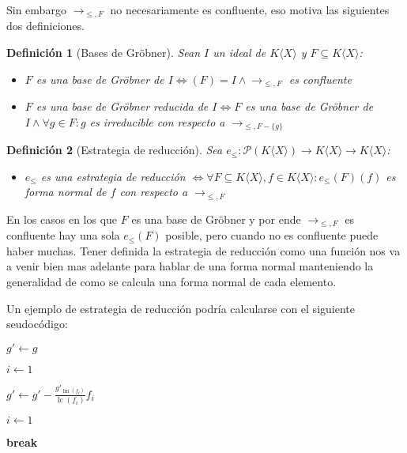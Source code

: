 \documentclass{amsbook} %
\theoremstyle{customstyle}
\newtheorem{definition}{Definición}[section]
\DeclareMathOperator{\sop}{sop}
\DeclareMathOperator{\lm}{lm}
\DeclareMathOperator{\lc}{lc}
\begin{document}
Sin embargo $→_{≤, F}$ no necesariamente es confluente, eso motiva las siguientes dos definiciones.

\begin{definition}[Bases de Gröbner]\label{def:base de Gröbner}
Sean $I$ un ideal de $K⟨X⟩$ y $F ⊆ K⟨X⟩$:
\begin{itemize}
\item $F$ es una base de Gröbner de $I ⇔ (F) = I ∧ →_{≤, F}$ es confluente
\item $F$ es una base de Gröbner reducida de $I ⇔ F$ es una base de Gröbner de $I ∧ ∀g ∈ F : g$ es irreducible con respecto a $→_{≤, F - \{g\}}$
\end{itemize}
\end{definition}

\begin{definition}[Estrategia de reducción]
Sea $e_≤ : 𝒫(K⟨X⟩) → K⟨X⟩ → K⟨X⟩$:
\begin{itemize}
\item $e_≤$ es una estrategia de reducción $⇔ ∀F ⊆ K⟨X⟩, f ∈ K⟨X⟩ : e_≤(F)(f)$ es forma normal de $f$ con respecto a $→_{≤, F}$
\end{itemize}
\end{definition}

En los casos en los que $F$ es una base de Gröbner y por ende $→_{≤, F}$ es confluente hay una sola $e_≤(F)$ posible, pero cuando no es confluente puede haber muchas. Tener definida la estrategia de reducción como una función nos va a venir bien mas adelante para hablar de una forma normal manteniendo la generalidad de como se calcula una forma normal de cada elemento.

Un ejemplo de estrategia de reducción podría calcularse con el siguiente seudocódigo:

\begin{algorithm}[H] %
  \caption{Ejemplo de estrategia de reducción}\label{alg:estrategia de reducción}
  $g' ← g$

  $i ← 1$

   {
     {
      \If{$f_i ∈ \sop(g')$} {
        $g' ← g' - \frac{g'_{\lm(f_i)}}{\lc(f_i)}f_i$

        $i ← 1$

        \textbf{break}
      }
    }
  }
\end{algorithm}
\end{document}
